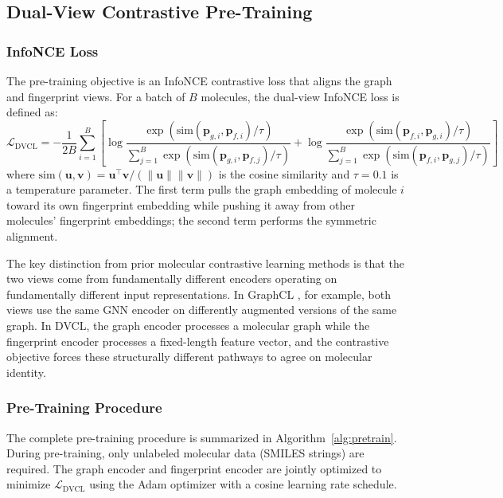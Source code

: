 \documentclass[a4paper,fleqn]{cas-sc}
\begin{document}
\subsection{Dual-View Contrastive Pre-Training}\label{sec:contrastive}

\subsubsection{InfoNCE Loss}

The pre-training objective is an InfoNCE contrastive loss \citep{oord2018representation} that aligns the graph and fingerprint views. For a batch of $B$ molecules, the dual-view InfoNCE loss is defined as:
\begin{equation}\label{eq:infonce}
\mathcal{L}_{\text{DVCL}} = -\frac{1}{2B} \sum_{i=1}^{B} \left[ \log \frac{\exp(\text{sim}(\mathbf{p}_{g,i}, \mathbf{p}_{f,i}) / \tau)}{\sum_{j=1}^{B} \exp(\text{sim}(\mathbf{p}_{g,i}, \mathbf{p}_{f,j}) / \tau)} + \log \frac{\exp(\text{sim}(\mathbf{p}_{f,i}, \mathbf{p}_{g,i}) / \tau)}{\sum_{j=1}^{B} \exp(\text{sim}(\mathbf{p}_{f,i}, \mathbf{p}_{g,j}) / \tau)} \right]
\end{equation}
where $\text{sim}(\mathbf{u}, \mathbf{v}) = \mathbf{u}^\top \mathbf{v} / (\|\mathbf{u}\| \|\mathbf{v}\|)$ is the cosine similarity and $\tau = 0.1$ is a temperature parameter. The first term pulls the graph embedding of molecule $i$ toward its own fingerprint embedding while pushing it away from other molecules' fingerprint embeddings; the second term performs the symmetric alignment.

The key distinction from prior molecular contrastive learning methods \citep{you2020graph, wang2022molclr} is that the two views come from fundamentally different encoders operating on fundamentally different input representations. In GraphCL \citep{you2020graph}, for example, both views use the same GNN encoder on differently augmented versions of the same graph. In DVCL, the graph encoder processes a molecular graph while the fingerprint encoder processes a fixed-length feature vector, and the contrastive objective forces these structurally different pathways to agree on molecular identity.

\subsubsection{Pre-Training Procedure}

The complete pre-training procedure is summarized in Algorithm~\ref{alg:pretrain}. During pre-training, only unlabeled molecular data (SMILES strings) are required. The graph encoder and fingerprint encoder are jointly optimized to minimize $\mathcal{L}_{\text{DVCL}}$ using the Adam optimizer with a cosine learning rate schedule.
\end{document}

